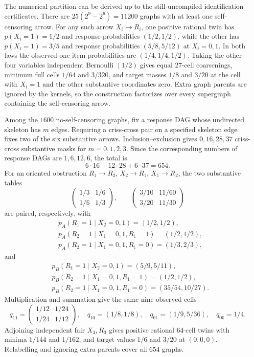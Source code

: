 The numerical partition can be derived up to the still-uncompiled identification certificates.  There are \(25(2^9-2^6)=11200\) graphs with at least one self-censoring arrow.  For any such arrow \(X_i\to R_i\), one positive rational twin has \(p(X_i=1)=1/2\) and response probabilities \((1/2,1/2)\), while the other has \(p(X_i=1)=3/5\) and response probabilities \((5/8,5/12)\) at \(X_i=0,1\).  In both laws the observed one-item probabilities are \((1/4,1/4,1/2)\).  Taking the other four variables independent Bernoulli \((1/2)\) gives equal \(27\)-cell coarsenings, minimum full cells \(1/64\) and \(3/320\), and target masses \(1/8\) and \(3/20\) at the cell with \(X_i=1\) and the other substantive coordinates zero.  Extra graph parents are ignored by the kernels, so the construction factorizes over every supergraph containing the self-censoring arrow.

Among the \(1600\) no-self-censoring graphs, fix a response DAG whose undirected skeleton has \(m\) edges.  Requiring a criss-cross pair on a specified skeleton edge fixes two of the six substantive arrows.  Inclusion--exclusion gives \(0,16,28,37\) criss-cross substantive masks for \(m=0,1,2,3\).  Since the corresponding numbers of response DAGs are \(1,6,12,6\), the total is
\[
6\cdot16+12\cdot28+6\cdot37=654.
\]
For an oriented obstruction \(R_1\to R_2\), \(X_2\to R_1\), \(X_1\to R_2\), the two substantive tables
\[
\begin{pmatrix}1/3&1/6\\1/6&1/3\end{pmatrix},
\qquad
\begin{pmatrix}3/10&11/60\\3/20&11/30\end{pmatrix}
\]
are paired, respectively, with
\[
\begin{aligned}
&p_A(R_1=1\mid X_2=0,1)=(1/2,1/2),\\
&p_A(R_2=1\mid X_1=0,1,R_1=1)=(1/2,1/2),\\
&p_A(R_2=1\mid X_1=0,1,R_1=0)=(1/3,2/3),
\end{aligned}
\]
and
\[
\begin{aligned}
&p_B(R_1=1\mid X_2=0,1)=(5/9,5/11),\\
&p_B(R_2=1\mid X_1=0,1,R_1=1)=(1/2,1/2),\\
&p_B(R_2=1\mid X_1=0,1,R_1=0)=(35/54,10/27).
\end{aligned}
\]
Multiplication and summation give the same nine observed cells
\[
q_{11}=\begin{pmatrix}1/12&1/24\\1/24&1/12\end{pmatrix},\quad
q_{10}=(1/8,1/8),\quad q_{01}=(1/9,5/36),\quad q_{00}=1/4.
\]
Adjoining independent fair \(X_3,R_3\) gives positive rational \(64\)-cell twins with minima \(1/144\) and \(1/162\), and target values \(1/6\) and \(3/20\) at \((0,0,0)\).  Relabelling and ignoring extra parents cover all \(654\) graphs.

